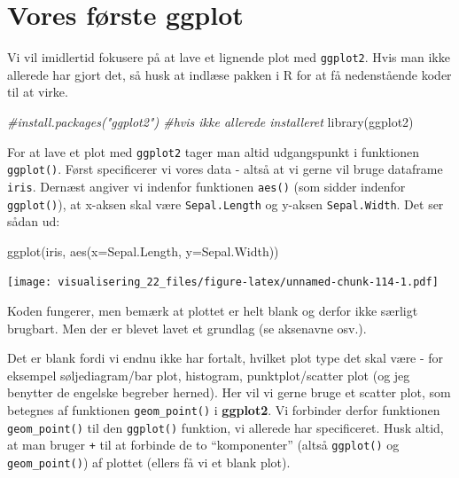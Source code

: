 \documentclass[
]{book}
\newenvironment{Shaded}{\begin{snugshade}}{\end{snugshade}}
\newcommand{\AttributeTok}[1]{\textcolor[rgb]{0.77,0.63,0.00}{#1}}
\newcommand{\CommentTok}[1]{\textcolor[rgb]{0.56,0.35,0.01}{\textit{#1}}}
\newcommand{\FunctionTok}[1]{\textcolor[rgb]{0.00,0.00,0.00}{#1}}
\newcommand{\NormalTok}[1]{#1}
\begin{document}
\hypertarget{vores-fuxf8rste-ggplot}{%
\section{Vores første ggplot}\label{vores-fuxf8rste-ggplot}}

Vi vil imidlertid fokusere på at lave et lignende plot med \texttt{ggplot2}. Hvis man ikke allerede har gjort det, så husk at indlæse pakken i R for at få nedenstående koder til at virke.

\begin{Shaded}
\begin{Highlighting}[]
\CommentTok{\#install.packages("ggplot2") \#hvis ikke allerede installeret}
\FunctionTok{library}\NormalTok{(ggplot2)}
\end{Highlighting}
\end{Shaded}

For at lave et plot med \texttt{ggplot2} tager man altid udgangspunkt i funktionen \texttt{ggplot()}. Først specificerer vi vores data - altså at vi gerne vil bruge dataframe \texttt{iris}. Dernæst angiver vi indenfor funktionen \texttt{aes()} (som sidder indenfor \texttt{ggplot()}), at x-aksen skal være \texttt{Sepal.Length} og y-aksen \texttt{Sepal.Width}. Det ser sådan ud:

\begin{Shaded}
\begin{Highlighting}[]
\FunctionTok{ggplot}\NormalTok{(iris, }\FunctionTok{aes}\NormalTok{(}\AttributeTok{x=}\NormalTok{Sepal.Length, }\AttributeTok{y=}\NormalTok{Sepal.Width))}
\end{Highlighting}
\end{Shaded}

\texttt{[image: visualisering\_22\_files/figure-latex/unnamed-chunk-114-1.pdf]}

Koden fungerer, men bemærk at plottet er helt blank og derfor ikke særligt brugbart. Men der er blevet lavet et grundlag (se aksenavne osv.).

Det er blank fordi vi endnu ikke har fortalt, hvilket plot type det skal være - for eksempel søljediagram/bar plot, histogram, punktplot/scatter plot (og jeg benytter de engelske begreber herned). Her vil vi gerne bruge et scatter plot, som betegnes af funktionen \texttt{geom\_point()} i \textbf{ggplot2}. Vi forbinder derfor funktionen \texttt{geom\_point()} til den \texttt{ggplot()} funktion, vi allerede har specificeret. Husk altid, at man bruger \texttt{+} til at forbinde de to ``komponenter'' (altså \texttt{ggplot()} og \texttt{geom\_point()}) af plottet (ellers få vi et blank plot).
\end{document}
